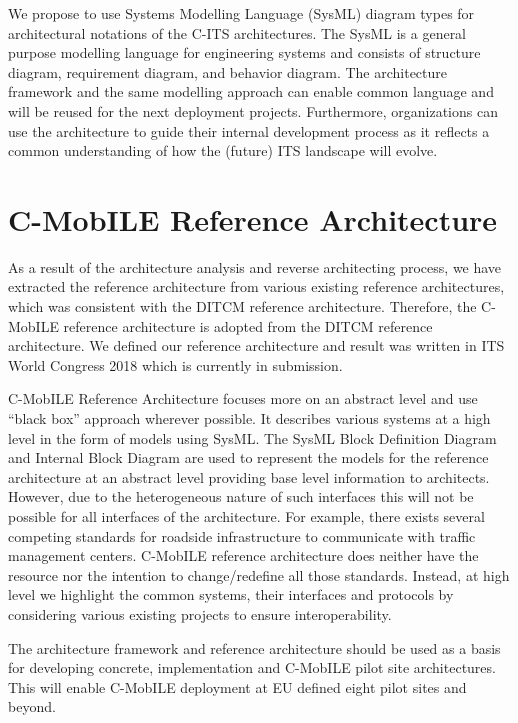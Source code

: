 \documentclass[conference]{IEEEtran}
\begin{document}
We propose to use Systems Modelling Language (SysML) diagram types for architectural notations of the C-ITS architectures. The SysML is a general purpose modelling language for engineering systems and consists of structure diagram, requirement diagram, and behavior diagram. The architecture framework and the same modelling approach can enable common language and will be reused for the next deployment projects. Furthermore, organizations can use the architecture to guide their internal development process as it reflects a common understanding of how the (future) ITS landscape will evolve.


\section{C-MobILE Reference Architecture}

As a result of the architecture analysis and reverse architecting process, we have extracted the reference architecture from various existing reference architectures, which was consistent with the DITCM reference architecture. Therefore, the C-MobILE reference architecture is adopted from the DITCM reference architecture. We defined our reference architecture and result was written in ITS World Congress 2018 which is currently in submission.

C-MobILE Reference Architecture focuses more on an abstract level and use “black box” approach wherever possible. It describes various systems at a high level in the form of models using SysML. The SysML Block Definition Diagram and Internal Block Diagram are used to represent the models for the reference architecture at an abstract level providing base level information to architects. However, due to the heterogeneous nature of such interfaces this will not be possible for all interfaces of the architecture. For example, there exists several competing standards for roadside infrastructure to communicate with traffic management centers. C-MobILE reference architecture does neither have the resource nor the intention to change/redefine all those standards. Instead, at high level we highlight the common systems, their interfaces and protocols by considering various existing projects to ensure interoperability. 

The architecture framework and reference architecture should be used as a basis for developing concrete, implementation and C-MobILE pilot site architectures. This will enable C-MobILE deployment at EU defined eight pilot sites and beyond. 
\end{document}

